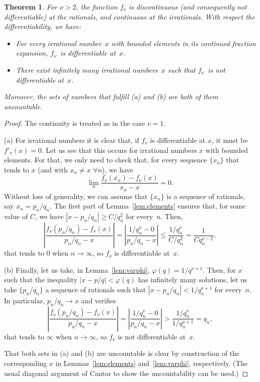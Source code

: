 \documentclass[11pt,a4paper,reqno]{amsart}
\theoremstyle{plain}
\newtheorem{theorem}{Theorem}
\theoremstyle{definition}
\begin{document}
\begin{theorem}
\label{theo:main}
For $\nu > 2$, the function $f_\nu$ is discontinuous (and consequently not differentiable) at the rationals, and continuous at the irrationals. 
With respect the differentiability, we have:
\begin{itemize}
\item[(a)] For every irrational number~$x$ with bounded elements in its continued fraction expansion, $f_\nu$~is differentiable at~$x$.
\item[(b)] There exist infinitely many irrational numbers~$x$ such that $f_\nu$~is not differentiable at~$x$.
\end{itemize}
Moreover, the sets of numbers that fulfill (a) and (b) are both of them uncountable.
\end{theorem}

\begin{proof}
The continuity is treated as in the case $\nu=1$.

(a) For irrational numbers it is clear that, if $f_\nu$ is differentiable at $x$, it must be $f'_\nu(x) = 0$. 
Let us see that this occurs for irrational numbers $x$ with bounded elements.
For that, we only need to check that, for every sequence $\{x_n\}$ that tends to $x$ (and with $x_n \ne x$ $\forall n$), we have
$$
  \lim_n \frac{f_\nu(x_n) - f_\nu(x)}{x_n-x} = 0.
$$
Without loss of generality, we can assume that $\{x_n\}$ is a sequence of rationals, say $x_n = p_n/q_n$.
The first part of Lemma~\ref{lem:elements} ensures that, for some value of $C$, we have $|x - p_n/q_n| \ge C/q_n^2$ for every~$n$.
Then, 
$$
  \left|\frac{f_\nu(p_n/q_n) - f_\nu(x)}{p_n/q_n - x} \right| 
  = \left| \frac{1/q_n^\nu - 0}{p_n/q_n - x} \right| 
  \le \frac{1/q_n^\nu}{C/q_n^2} = \frac{1}{C q_n^{\nu-2}},
$$
that tends to $0$ when $n\to\infty$, so $f_\nu$ is differentiable at~$x$.

(b) Finally, let us take, in Lemma~\ref{lem:varphi}, $\varphi(q) = 1/q^{\nu+1}$. Then, for $x$ such that the inequality $|x - p/q| < \varphi(q)$ has infinitely many solutions, let us take $\{p_n/q_n\}$ a sequence of rationals such that $|x - p_n/q_n| < 1/q_n^{\nu+1}$ for every~$n$. In particular, $p_n/q_n \to x$ and verifies
$$
  \left|\frac{f_\nu(p_n/q_n) - f_\nu(x)}{p_n/q_n - x} \right| 
  = \left|\frac{1/q_n^\nu - 0}{p_n/q_n - x} \right| 
  > \frac{1/q_n^\nu}{1/q_n^{\nu+1}} = q_n,
$$
that tends to $\infty$ when $n\to\infty$, so $f_\nu$ is not differentiable at~$x$.

That both sets in (a) and (b) are uncountable is clear by construction of the corresponding $x$ in Lemmas~\ref{lem:elements} and~\ref{lem:varphi}, respectively. (The usual diagonal argument of Cantor to show the uncountability can be used.)
\end{proof}
\end{document}
